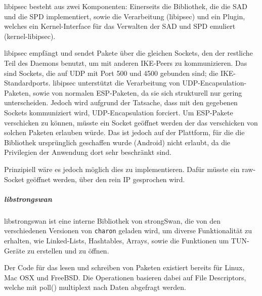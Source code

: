 libipsec besteht aus zwei Komponenten: Einerseits die Bibliothek, die die SAD und die SPD
implementiert, sowie die Verarbeitung (libipsec) und ein Plugin, welches ein Kernel-Interface
für das Verwalten der \ac{SAD} und \ac{SPD} emuliert (kernel-libipsec).

libipsec empfängt und sendet Pakete über die gleichen Sockets, den der restliche Teil
des Daemons benutzt, um mit anderen IKE-Peers zu kommunizieren. Das sind Sockets,
die auf UDP mit Port 500 und 4500 gebunden sind; die IKE-Standardports.
libipsec unterstützt die Verarbeitung von UDP-Encapsulation-Paketen, sowie von normalen ESP-Paketen,
da sie sich strukturell nur gering unterscheiden. Jedoch wird aufgrund der Tatsache,
dass mit den gegebenen Sockets kommuniziert wird, UDP-Encapsulation forciert.
Um ESP-Pakete verschicken zu können, müsste ein Socket geöffnet werden der das
verschicken von solchen Paketen erlauben würde. Das ist jedoch auf der Plattform,
für die die Bibliothek ursprünglich geschaffen wurde (Android) nicht erlaubt, da
die Privilegien der Anwendung dort sehr beschränkt sind.

Prinzipiell wäre es jedoch möglich dies zu implementieren. Dafür müsste ein
raw-Socket geöffnet werden, über den rein IP gesprochen wird.

\subparagraph{libstrongswan}
libstrongswan ist eine interne Bibliothek von strongSwan, die von den verschiedenen
Versionen von \texttt{charon} geladen wird, um diverse Funktionalität zu erhalten, wie
Linked-Lists, Hashtables, Arrays, sowie die Funktionen um TUN-Geräte zu erstellen und zu öffnen.

Der Code für das lesen und schreiben von Paketen existiert bereits für Linux, Mac OSX
und FreeBSD.
Die Operationen basieren dabei auf File Descriptors, welche mit poll() multiplext nach
Daten abgefragt werden.
